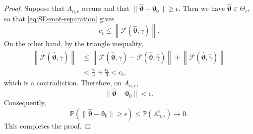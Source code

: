 \documentclass[10pt,a4paper]{amsart}
\newcommand{\pr}{\mathbb{P}}
\renewcommand{\hat}{\widehat}
\begin{document}
\begin{proof}
Suppose that $A_{n,\epsilon}$ occurs and that $\|\hat{\bm\vartheta}-\bm\vartheta_0\|
\ge\epsilon.$
Then we have
$\hat{\bm\vartheta}\in\Theta_\epsilon$, so that
\eqref{eq:SE-root-separation} gives
\[
c_\epsilon
\le
\left\|
\mathcal F(\hat{\bm\vartheta},\gamma)
\right\|.
\]
On the other hand, by the triangle inequality,
\begin{align*}
\left\|
\mathcal F(\hat{\bm\vartheta},\gamma)
\right\|
&\le
\left\|
\mathcal F(\hat{\bm\vartheta},\gamma)
-
\mathcal F(\hat{\bm\vartheta},\hat\gamma)
\right\|
+
\left\|
\mathcal F(\hat{\bm\vartheta},\hat\gamma)
\right\|\\
&<
\frac{c_\epsilon}{3}
+
\frac{c_\epsilon}{3}
<
c_\epsilon,
\end{align*}
which is a contradiction. Therefore, on $A_{n,\epsilon}$,
\[
\|\hat{\bm\vartheta}-\bm\vartheta_0\|<\epsilon.
\]
Consequently,
\[
\pr\left(
\|\hat{\bm\vartheta}-\bm\vartheta_0\|
\ge\epsilon
\right)
\le
\pr(A_{n,\epsilon}^c)
\rightarrow0.
\]
This completes the proof.
\end{proof}
\end{document}
